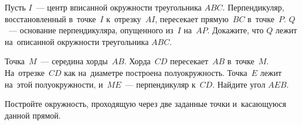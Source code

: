 \begin{problems}
\item
Пусть $I$~— центр вписанной окружности треугольника $ABC$.
Перпендикуляр, восстановленный в~точке~$I$ к~отрезку~$AI$, пересекает
прямую~$BC$ в~точке~$P$.
$Q$~— основание перпендикуляра, опущенного из~$I$ на~$AP$.
Докажите, что $Q$ лежит на~описанной окружности треугольника $ABC$.

\item
Точка~$M$~— середина хорды~$AB$.
Хорда~$CD$ пересекает~$AB$ в~точке~$M$.
На~отрезке~$CD$ как на~диаметре построена полуокружность.
Точка~$E$ лежит на~этой полуокружности, и~$ME$~— перпендикуляр к~$CD$.
Найдите угол $AEB$.

\item
Постройте окружность, проходящую через две заданные точки и~касающуюся данной
прямой.

\end{problems}

